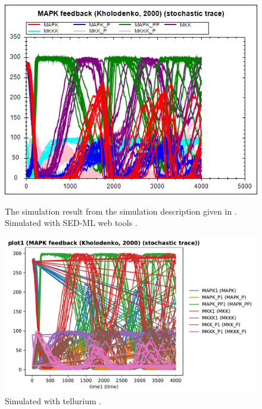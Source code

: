 \begin{figure}[ht]
    \centering
    \begin{minipage}{0.47\textwidth}
        \centering
        \includegraphics[width=1.0\textwidth]{examples/repeated-stochastic-runs/results/sedml_webtools/plot1}
        \caption{The simulation result from the simulation description given in . Simulated with SED-ML web tools \citep{bergmann2017sed}.}
    \end{minipage}\hfill
    \begin{minipage}{0.47\textwidth}
        \centering
        \includegraphics[width=1.0\textwidth]{examples/repeated-stochastic-runs/results/tellurium/plot1}
        \caption{Simulated with tellurium \citep{tellurium}.}
    \end{minipage}
    \label{fig:repeated-stochastic-runs}
\end{figure}

